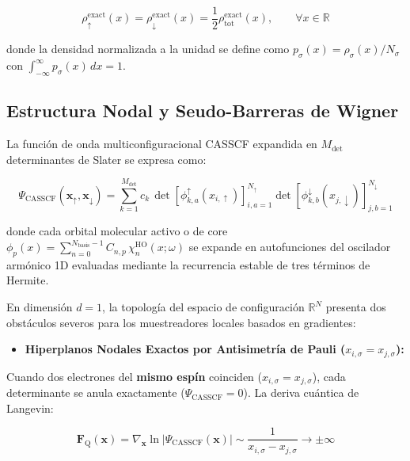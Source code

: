 \documentclass[10pt,a4paper]{article}
\begin{document}
\[
\rho_\uparrow^{\mathrm{exact}}(x) = \rho_\downarrow^{\mathrm{exact}}(x) = \frac{1}{2}\rho_{\mathrm{tot}}^{\mathrm{exact}}(x), \qquad \forall x \in \mathbb{R}
\]



donde la densidad normalizada a la unidad se define como $p_\sigma(x) = \rho_\sigma(x) / N_\sigma$ con $\int_{-\infty}^{\infty} p_\sigma(x)\,dx = 1$.




\subsection{Estructura Nodal y Seudo-Barreras de Wigner}

La función de onda multiconfiguracional CASSCF expandida en $M_{\mathrm{det}}$ determinantes de Slater se expresa como:



\[
\Psi_{\mathrm{CASSCF}}(\mathbf{x}_\uparrow, \mathbf{x}_\downarrow) = \sum_{k=1}^{M_{\mathrm{det}}} c_k \, \det\!\left[\phi_{k,a}^\uparrow(x_{i,\uparrow})\right]_{i,a=1}^{N_\uparrow} \det\!\left[\phi_{k,b}^\downarrow(x_{j,\downarrow})\right]_{j,b=1}^{N_\downarrow}
\]



donde cada orbital molecular activo o de core $\phi_p(x) = \sum_{n=0}^{N_{\mathrm{basis}}-1} C_{n,p}\,\chi_n^{\mathrm{HO}}(x; \omega)$ se expande en autofunciones del oscilador armónico 1D evaluadas mediante la recurrencia estable de tres términos de Hermite.



En dimensión $d=1$, la topología del espacio de configuración $\mathbb{R}^N$ presenta dos obstáculos severos para los muestreadores locales basados en gradientes:



\begin{itemize}
\item \textbf{Hiperplanos Nodales Exactos por Antisimetría de Pauli ($x_{i,\sigma} = x_{j,\sigma}$):}
\end{itemize}

   Cuando dos electrones del \textbf{mismo espín} coinciden ($x_{i,\sigma} = x_{j,\sigma}$), cada determinante se anula exactamente ($\Psi_{\mathrm{CASSCF}} = 0$). La deriva cuántica de Langevin:

\[
   \mathbf{F}_{\mathrm{Q}}(\mathbf{x}) = \nabla_{\mathbf{x}} \ln |\Psi_{\mathrm{CASSCF}}(\mathbf{x})| \sim \frac{1}{x_{i,\sigma} - x_{j,\sigma}} \to \pm\infty
\]
\end{document}
